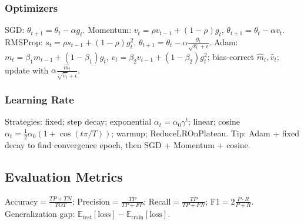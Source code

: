 \subsubsection*{Optimizers}
SGD: $\theta_{t+1}=\theta_t-\alpha g_t$.
Momentum: $v_t=\rho v_{t-1}+(1-\rho)g_t$, $\theta_{t+1}=\theta_t-\alpha v_t$.
RMSProp: $s_t=\rho s_{t-1}+(1-\rho)g_t^2$, $\theta_{t+1}=\theta_t-\alpha\frac{g_t}{\sqrt{s_t}+\epsilon}$.
Adam: $m_t=\beta_1m_{t-1}+(1-\beta_1)g_t$, $v_t=\beta_2v_{t-1}+(1-\beta_2)g_t^2$; bias-correct $\hat m_t,\hat v_t$; update with $\alpha\frac{\hat m_t}{\sqrt{\hat v_t}+\epsilon}$.

\subsubsection*{Learning Rate}
Strategies: fixed; step decay; exponential $\alpha_t=\alpha_0\gamma^t$; linear; cosine $\alpha_t=\frac{1}{2}\alpha_0(1+\cos(t\pi/T))$; warmup; ReduceLROnPlateau.
Tip: Adam + fixed decay to find convergence epoch, then SGD + Momentum + cosine.

\subsection{Evaluation Metrics}
Accuracy$=\frac{TP+TN}{TOT}$; Precision$=\frac{TP}{TP+FP}$; Recall$=\frac{TP}{TP+FN}$; F1$=2\frac{P\cdot R}{P+R}$.
Generalization gap: $\mathbb{E}_{\text{test}}[\text{loss}]-\mathbb{E}_{\text{train}}[\text{loss}]$.
